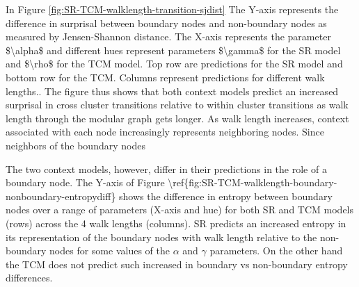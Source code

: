 In Figure \ref{fig:SR-TCM-walklength-transition-sjdist} \ac{The Y-axis represents the difference in surprisal between boundary nodes and non-boundary nodes as measured by Jensen-Shannon distance. The X-axis represents the parameter $\alpha$ and different hues represent parameters $\gamma$ for the SR model and $\rho$ for the TCM model. Top row are predictions for the SR model and bottom row for the TCM. Columns represent predictions for different walk lengths.}. The figure thus shows that both context models predict an increased surprisal \ac{in cross cluster transitions relative to within cluster transitions} as walk length through the modular graph gets longer. As walk length increases, context associated with each node increasingly represents neighboring nodes. Since neighbors of the boundary nodes 

The two context models, however, differ in their predictions in the role of a boundary node. \ac{The Y-axis of Figure \ref{fig:SR-TCM-walklength-boundary-nonboundary-entropydiff} shows the difference in entropy between boundary nodes over a range of parameters (X-axis and hue) for both SR and TCM models (rows) across the 4 walk lengths (columns).} SR predicts an increased entropy in its representation of the boundary nodes with walk length relative to the non-boundary nodes for some values of the $\alpha$ and $\gamma$ parameters. On the other hand the TCM does not predict such increased in boundary vs non-boundary entropy differences. 


